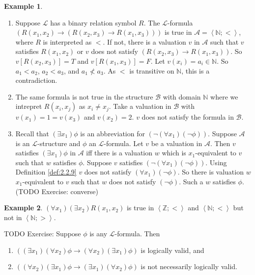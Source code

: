 \documentclass{article}
\newcommand{\N}{\mathbb{N}}
\newcommand{\Z}{\mathbb{Z}}
\newcommand{\rb}[1]{\left( #1 \right)}
\renewcommand{\sb}[1]{\left[ #1 \right]}
\newcommand{\ab}[1]{\left\langle #1 \right\rangle}
\newcommand{\notb}[1]{\rb{\neg #1}}
\newcommand{\impb}[2]{\rb{#1 \rightarrow #2}}
\newcommand{\fab}[1]{\rb{\forall #1}}
\newcommand{\teb}[1]{\rb{\exists #1}}
\theoremstyle{definition}\newtheorem{definition}{Definition}[subsection]
\theoremstyle{definition}\newtheorem{remark}[definition]{Remark}
\theoremstyle{definition}\newtheorem*{example}{Example}
\theoremstyle{definition}\newtheorem*{note}{Note}
\begin{document}
\begin{example}
\hfill
\begin{enumerate}
\item Suppose $ \mathcal{L} $ has a binary relation symbol $ R $. The $ \mathcal{L} $-formula $ \impb{R\rb{x_1, x_2}}{\impb{R\rb{x_2, x_3}}{R\rb{x_1, x_3}}} $ is true in $ \mathcal{A} = \ab{\N; <} $, where $ R $ is interpreted as $ < $. If not, there is a valuation $ v $ in $ \mathcal{A} $ such that $ v $ satisfies $ R\rb{x_1, x_2} $ or $ v $ does not satisfy $ \impb{R\rb{x_2, x_3}}{R\rb{x_1, x_3}} $. So $ v\sb{R\rb{x_2, x_3}} = T $ and $ v\sb{R\rb{x_1, x_3}} = F $. Let $ v\rb{x_i} = a_i \in \N $. So $ a_1 < a_2 $, $ a_2 < a_3 $, and $ a_1 \not< a_3 $. As $ < $ is transitive on $ \N $, this is a contradiction.
\item The same formula is not true in the structure $ \mathcal{B} $ with domain $ \N $ where we intrepret $ R\rb{x_i, x_j} $ as $ x_i \ne x_j $. Take a valuation in $ \mathcal{B} $ with $ v\rb{x_1} = 1 = v\rb{x_3} $ and $ v\rb{x_2} = 2 $. $ v $ does not satisfy the formula in $ \mathcal{B} $.
\item Recall that $ \teb{x_1}\phi $ is an abbreviation for $ \notb{\fab{x_1}\notb{\phi}} $. Suppose $ \mathcal{A} $ is an $ \mathcal{L} $-structure and $ \phi $ an $ \mathcal{L} $-formula. Let $ v $ be a valuation in $ \mathcal{A} $. Then $ v $ satisfies $ \teb{x_1}\phi $ in $ \mathcal{A} $ iff there is a valuation $ w $ which is $ x_1 $-equivalent to $ v $ such that $ w $ satisfies $ \phi $. Suppose $ v $ satisfies $ \notb{\fab{x_1}\notb{\phi}} $. Using Definition \ref{def:2.2.9} $ v $ does not satisfy $ \fab{x_1}\notb{\phi} $. So there is valuation $ w $ $ x_1 $-equivalent to $ v $ such that $ w $ does not satisfy $ \notb{\phi} $. Such a $ w $ satisfies $ \phi $. (TODO Exercise: converse)
\end{enumerate}
\end{example}

\begin{example}
$ \fab{x_1}\teb{x_2}R\rb{x_1, x_2} $ is true in $ \ab{\Z; <} $ and $ \ab{\N; <} $ but not in $ \ab{\N; >} $.
\end{example}

TODO Exercise: Suppose $ \phi $ is any $ \mathcal{L} $-formula. Then
\begin{enumerate}
\item $ \impb{\teb{x_1}\fab{x_2}\phi}{\fab{x_2}\teb{x_1}\phi} $ is logically valid, and
\item $ \impb{\fab{x_2}\teb{x_1}\phi}{\teb{x_1}\fab{x_2}\phi} $ is not necessarily logically valid.
\end{enumerate}
\end{document}
